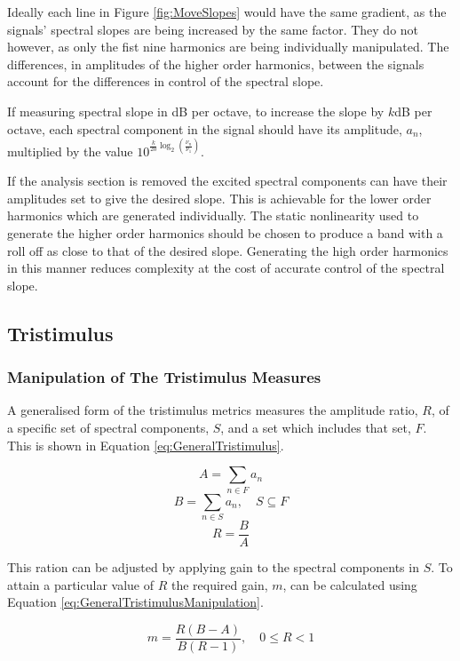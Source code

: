 			Ideally each line in Figure \ref{fig:MoveSlopes} would have the same gradient, as the signals'
			spectral slopes are being increased by the same factor. They do not however, as only the fist nine
			harmonics are being individually manipulated. The differences, in amplitudes of the higher order
			harmonics, between the signals account for the differences in control of the spectral slope.

			If measuring spectral slope in dB per octave, to increase the slope by $k$dB per octave, each
			spectral component in the signal should have its amplitude, $a_{n}$, multiplied by the value
			$10^{\frac{k}{20}\log_{2} \left( \frac{\nu_{n}}{\nu_{1}} \right)}$.

			If the analysis section is removed the excited spectral components can have their amplitudes set to
			give the desired slope. This is achievable for the lower order harmonics which are generated
			individually.  The static nonlinearity used to generate the higher order harmonics should be chosen
			to produce a band with a roll off as close to that of the desired slope. Generating the high order
			harmonics in this manner reduces complexity at the cost of accurate control of the spectral slope.

	\subsection{Tristimulus}
	\label{sec:FeatureControl-Parameterisation-Tristimulus}
		\subsubsection*{Manipulation of The Tristimulus Measures}
			A generalised form of the tristimulus metrics measures the amplitude ratio, $R$, of a specific set
			of spectral components, $S$, and a set which includes that set, $F$. This is shown in Equation
			\ref{eq:GeneralTristimulus}.

			\[ A = \sum_{n \in F} a_{n} \]
			\[ B = \sum_{n \in S} a_{n}, \quad S \subseteq F \]
			\begin{equation}
				R = \frac{B}{A}
				\label{eq:GeneralTristimulus}
			\end{equation}

			This ration can be adjusted by applying gain to the spectral components in $S$. To attain a
			particular value of $R$ the required gain, $m$, can be calculated using Equation
			\ref{eq:GeneralTristimulusManipulation}.

			\begin{equation}
				m = \frac{R(B - A)}{B(R - 1)}, \quad 0 \leq R < 1
				\label{eq:GeneralTristimulusManipulation}
			\end{equation}

